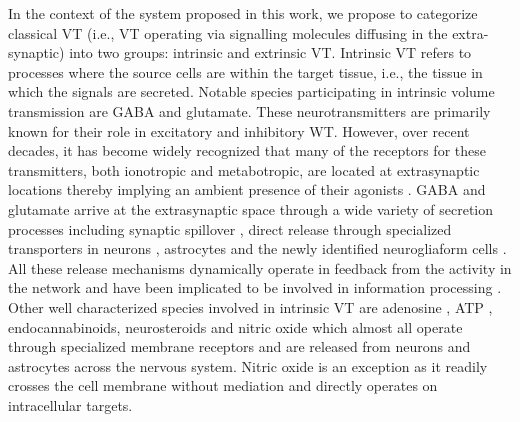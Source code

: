     In the context of the system proposed in this work, we propose to categorize classical VT (i.e., VT operating via signalling molecules diffusing in the extra-synaptic) into two groups: intrinsic and extrinsic VT. Intrinsic VT refers to processes where the source cells are within the target tissue, i.e., the tissue in which the signals are secreted. Notable species participating in intrinsic volume transmission are GABA and glutamate. These neurotransmitters are primarily known for their role in excitatory and inhibitory WT. However, over recent decades, it has become widely recognized that many of the receptors for these transmitters, both ionotropic and metabotropic, are located at extrasynaptic locations thereby implying an ambient presence of their agonists \cite{farrant2005variations,taber2014volume,wall1997development}. GABA and glutamate arrive at the extrasynaptic space through a wide variety of secretion processes including synaptic spillover \cite{matsui2003ectopic,hamann2002tonic,bellamy2006interactions}, direct release through specialized transporters in neurons \cite{cavelier2005tonic}, astrocytes \cite{lee2010channel,cavelier2005DIDS} and the newly identified neurogliaform cells \cite{olah2009regulation}. All these release mechanisms dynamically operate in feedback from the activity in the network and have been implicated to be involved in information processing \cite{mann2010control,hamann2002tonic,lenk2016understanding,cavelier2005tonic}. Other well characterized species involved in intrinsic VT are adenosine \cite{wall2015localized}, ATP \cite{zhang2003atp}, endocannabinoids, neurosteroids and nitric oxide \cite{fuxe2010discovery,bellamy2000rapid} which almost all operate through specialized membrane receptors and are released from neurons and astrocytes across the nervous system. Nitric oxide is an exception as it readily crosses the cell membrane without mediation and directly operates on intracellular targets.

